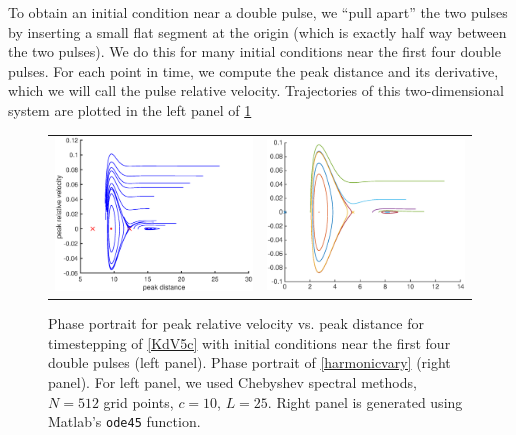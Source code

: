 \documentclass[thesis.tex]{subfiles}
\begin{document}
To obtain an initial condition near a double pulse, we ``pull apart'' the two pulses by inserting a small flat segment at the origin (which is exactly half way between the two pulses). We do this for many initial conditions near the first four double pulses. For each point in time, we compute the peak distance and its derivative, which we will call the pulse relative velocity. Trajectories of this two-dimensional system are plotted in the left panel of \cref{fig:KdV5timestep}

\begin{figure}[H]
\begin{center}
\begin{tabular}{cc}
\includegraphics[width=8cm]{images/kdv5numerics/phaseportrait} &
\includegraphics[width=8cm]{images/kdv5numerics/simplephaseportrait} \\
\end{tabular}
\caption{Phase portrait for peak relative velocity vs. peak distance for timestepping of \cref{KdV5c} with initial conditions near the first four double pulses (left panel). Phase portrait of \cref{harmonicvary} (right panel). For left panel, we used Chebyshev spectral methods, $N = 512$ grid points, $c = 10$, $L = 25$. Right panel is generated using Matlab's \texttt{ode45} function.
}
\label{fig:KdV5timestep}
\end{center}
\end{figure}
\end{document}
